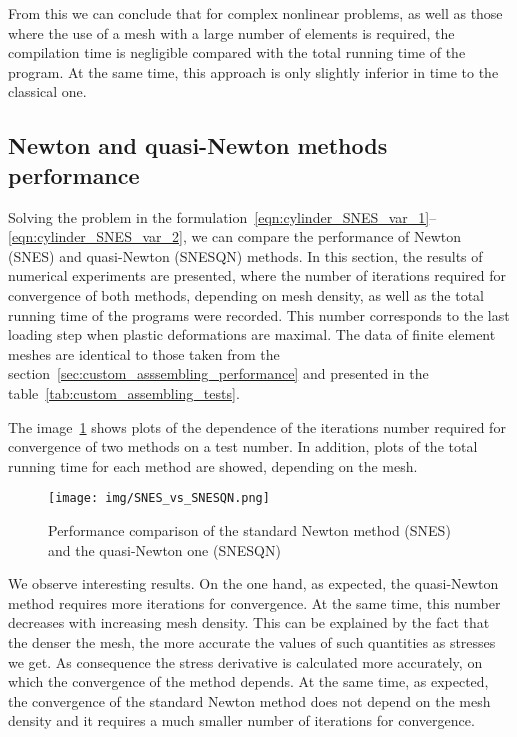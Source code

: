 \documentclass[12pt]{article}
\begin{document}
From this we can conclude that for complex nonlinear problems, as well as those where the use of a mesh with a large number of elements is required, the compilation time is negligible compared with the total running time of the program. At the same time, this approach is only slightly inferior in time to the classical one.

\subsection{Newton and quasi-Newton methods performance}

Solving the problem in the formulation~\eqref{eqn:cylinder_SNES_var_1}--\eqref{eqn:cylinder_SNES_var_2}, we can compare the performance of Newton (SNES) and quasi-Newton (SNESQN) methods. In this section, the results of numerical experiments are presented, where the number of iterations required for convergence of both methods, depending on mesh density, as well as the total running time of the programs were recorded. This number corresponds to the last loading step when plastic deformations are maximal. The data of finite element meshes are identical to those taken from the section~\ref{sec:custom_asssembling_performance} and presented in the table~\ref{tab:custom_assembling_tests}.

The image~\ref{fig:SNES_vs_SNESQN} shows plots of the dependence of the iterations number required for convergence of two methods on a test number. In addition, plots of the total running time for each method are showed, depending on the mesh. 

\begin{figure}[H]
    \center
    \texttt{[image: img/SNES\_vs\_SNESQN.png]}
    \caption{Performance comparison of the standard Newton method (SNES) and the quasi-Newton one (SNESQN)}
    \label{fig:SNES_vs_SNESQN}
\end{figure}

We observe interesting results. On the one hand, as expected, the quasi-Newton method requires more iterations for convergence. At the same time, this number decreases with increasing mesh density. This can be explained by the fact that the denser the mesh, the more accurate the values of such quantities as stresses we get. As consequence the stress derivative is calculated more accurately, on which the convergence of the method depends. At the same time, as expected, the convergence of the standard Newton method does not depend on the mesh density and it requires a much smaller number of iterations for convergence. 
\end{document}
